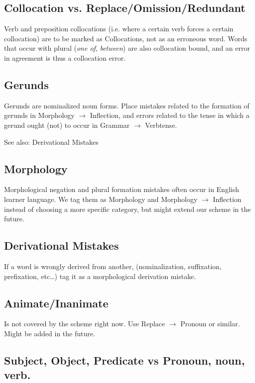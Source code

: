 \documentclass{article}
\begin{document}
\subsection{Collocation vs. Replace/Omission/Redundant}

Verb and preposition collocations (i.e. where a certain verb forces a certain
collocation) are to be marked as Collocations, not as an erroneous word. Words
that occur with plural (\textit{one of}, \textit{between}) are also collocation
bound, and an error in agreement is thus a collocation error.

\subsection{Gerunds}

Gerunds are nominalized noun forms.  Place mistakes related to the formation of
gerunds in Morphology $\to$ Inflection, and errors related to the tense in which a
gerund ought (not) to occur in Grammar $\to$ Verbtense.

See also: Derivational Mistakes

\subsection{Morphology}

Morphological negation and plural formation mistakes often occur in English
learner language. We tag them as Morphology and Morphology $\to$ Inflection instead
of choosing a more specific category, but might extend our scheme in the future.

\subsection{Derivational Mistakes}

If a word is wrongly derived from another, (nominalization, suffixation,
prefixation, etc\ldots) tag it as a morphological derivation mistake.

\subsection{Animate/Inanimate}

Is not covered by the scheme right now. Use Replace $\to$ Pronoun or similar. Might
be added in the future.

\subsection{Subject, Object, Predicate vs Pronoun, noun, verb.}
\end{document}
